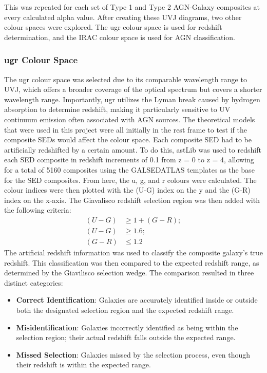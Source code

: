 This was repeated for each set of Type 1 and Type 2 AGN-Galaxy composites at every calculated alpha value. After creating these UVJ diagrams, two other colour spaces were explored. The ugr colour space is used for redshift determination, and the IRAC colour space is used for AGN classification.
\subsubsection{ugr Colour Space}
The ugr colour space was selected due to its comparable wavelength range to UVJ, which offers a broader coverage of the optical spectrum but covers a shorter wavelength range. Importantly, ugr utilizes the Lyman break caused by hydrogen absorption to determine redshift, making it particularly sensitive to UV continuum emission often associated with AGN sources. The theoretical models that were used in this project were all initially in the rest frame to test if the composite SEDs would affect the colour space. Each composite SED had to be artificially redshifted by a certain amount. To do this, astLib was used to redshift each SED composite in redshift increments of 0.1 from z = 0 to z = 4, allowing for a total of 5160 composites using the GALSEDATLAS templates as the base for the SED composites. From here, the u, g, and r colours were calculated. The colour indices were then plotted with the (U-G) index on the y and the (G-R) index on the x-axis. The Giavalisco redshift selection region was then added with the following criteria:
\begin{align*}
(U - G) &\geq 1 + (G - R); \\
(U - G) &\geq 1.6; \\
(G - R) &\leq 1.2
\end{align*}
The artificial redshift information was used to classify the composite galaxy's true redshift. This classification was then compared to the expected redshift range, as determined by the Giavilisco selection wedge. The comparison resulted in three distinct categories:
\begin{itemize}[label=\textbullet] %
    \item \textbf{Correct Identification}: Galaxies are accurately identified inside or outside both the designated selection region and the expected redshift range.
    \item \textbf{Misidentification}: Galaxies incorrectly identified as being within the selection region; their actual redshift falls outside the expected range.
    \item \textbf{Missed Selection}: Galaxies missed by the selection process, even though their redshift is within the expected range.
\end{itemize}

